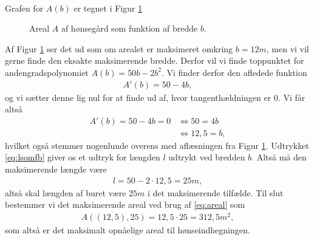 \begin{exa}
\begin{align*}
\end{align*}
Grafen for $A(b)$ er tegnet i Figur \ref{fig:honsegraf}
\begin{figure}[H]
	\centering
	\caption{Areal $A$ af hønsegård som funktion af bredde $b$.}
	\label{fig:honsegraf}
\end{figure}

Af Figur \ref{fig:honsegraf} ser det ud som om arealet er maksimeret omkring $b=12m$, men vi vil gerne finde den eksakte maksimerende bredde. Derfor vil vi finde toppunktet for andengradspolynomiet $A(b) = 50b-2b^2$. Vi finder derfor den afledede funktion
\begin{align*}
A'(b) = 50-4b,
\end{align*}
og vi sætter denne lig nul for at finde ud af, hvor tangenthældningen er $0$. Vi får altså
\begin{align*}
A'(b) = 50-4b = 0 &\Leftrightarrow 50=4b\\
&\Leftrightarrow 12,5=b,
\end{align*}
hvilket også stemmer nogenlunde overens med aflæsningen fra Figur \ref{fig:honsegraf}. Udtrykket \eqref{eq:lsomfb} giver os et udtryk for længden $l$ udtrykt ved bredden $b$. Altså må den maksimerende længde være 
\begin{align*}
l = 50-2\cdot 12,5 = 25m,
\end{align*}
altså skal længden af buret være $25m$ i det maksimerende tilfælde. Til slut bestemmer vi det maksimerende areal ved brug af \eqref{eq:areal} som
\begin{align*}
A((12,5),25) = 12,5\cdot25 = 312,5m^2,
\end{align*}
som altså er det maksimalt opnåelige areal til hønseindhegningen. 
\end{exa}
